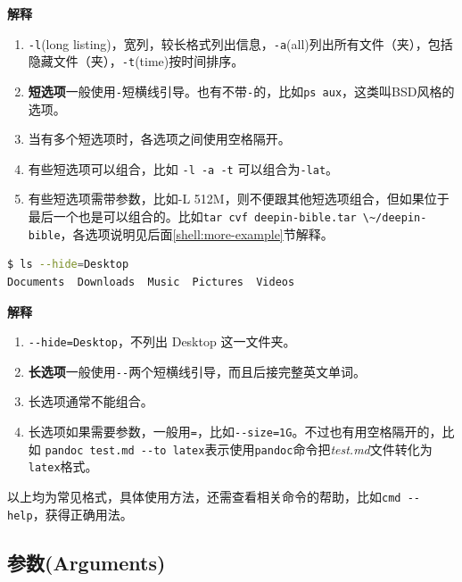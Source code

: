 \documentclass[doctor,openright,twoside]{sjtuthesis}
\providecommand{\tightlist}{%
    \setlength{\itemsep}{0pt}\setlength{\parskip}{0pt}}
\newcommand{\passthrough}[1]{#1}
\theoremstyle{plain}
\theoremstyle{definition}
\theoremstyle{remark}
\theoremstyle{ocrenumbox}
\theoremstyle{plain}
\begin{document}
\textbf{解释}

\begin{enumerate}
\def\labelenumi{\arabic{enumi}.}
\tightlist
\item
  \passthrough{\lstinline!-l!}(long
  listing)，宽列，较长格式列出信息，\passthrough{\lstinline!-a!}(all)列出所有文件（夹），包括隐藏文件（夹），\passthrough{\lstinline!-t!}(time)按时间排序。
\item
  \textbf{短选项}一般使用\passthrough{\lstinline!-!}短横线引导。也有不带\passthrough{\lstinline!-!}的，比如\passthrough{\lstinline!ps aux!}，这类叫BSD风格的选项。
\item
  当有多个短选项时，各选项之间使用空格隔开。
\item
  有些短选项可以组合，比如 \passthrough{\lstinline!-l -a -t!}
  可以组合为\passthrough{\lstinline!-lat!}。
\item
  有些短选项需带参数，比如-L
  512M，则不便跟其他短选项组合，但如果位于最后一个也是可以组合的。比如\passthrough{\lstinline!tar cvf deepin-bible.tar \~/deepin-bible!}，各选项说明见后面\ref{shell:more-example}节解释。
\end{enumerate}

\begin{lstlisting}[language=bash]
$ ls --hide=Desktop
Documents  Downloads  Music  Pictures  Videos
\end{lstlisting}

\textbf{解释}

\begin{enumerate}
\def\labelenumi{\arabic{enumi}.}
\tightlist
\item
  \passthrough{\lstinline!--hide=Desktop!}，不列出 Desktop 这一文件夹。
\item
  \textbf{长选项}一般使用\passthrough{\lstinline!--!}两个短横线引导，而且后接完整英文单词。
\item
  长选项通常不能组合。
\item
  长选项如果需要参数，一般用\passthrough{\lstinline!=!}，比如\passthrough{\lstinline!--size=1G!}。不过也有用空格隔开的，比如
  \passthrough{\lstinline!pandoc test.md --to latex!}表示使用\passthrough{\lstinline!pandoc!}命令把\emph{test.md}文件转化为\passthrough{\lstinline!latex!}格式。
\end{enumerate}

以上均为常见格式，具体使用方法，还需查看相关命令的帮助，比如\passthrough{\lstinline!cmd --help!}，获得正确用法。

\hypertarget{arguments}{%
\subsection{参数(Arguments)}\label{arguments}}
\end{document}
